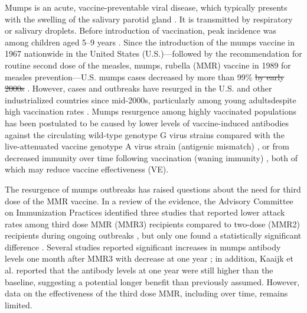 \documentclass[12pt]{article}
\providecommand{\DIFaddtex}[1]{{\protect\color{blue}\uwave{#1}}} %
\providecommand{\DIFdeltex}[1]{{\protect\color{red}\sout{#1}}}                      %
\providecommand{\DIFaddbegin}{} %
\providecommand{\DIFaddend}{} %
\providecommand{\DIFdelbegin}{} %
\providecommand{\DIFdelend}{} %
\providecommand{\DIFadd}[1]{\texorpdfstring{\DIFaddtex{#1}}{#1}} %
\providecommand{\DIFdel}[1]{\texorpdfstring{\DIFdeltex{#1}}{}} %
\newcommand{\DIFscaledelfig}{0.5}
\newlength{\DIFdelgraphicswidth} %
\newlength{\DIFdelgraphicsheight} %
\newcommand{\DIFaddincludegraphics}[2][]{{\color{blue}\fbox{\DIFOincludegraphics[#1]{#2}}}} %
\newcommand{\DIFdelincludegraphics}[2][]{%
\sbox{\DIFdelgraphicsbox}{\DIFOincludegraphics[#1]{#2}}%
\settoboxwidth{\DIFdelgraphicswidth}{\DIFdelgraphicsbox} %
\settoboxtotalheight{\DIFdelgraphicsheight}{\DIFdelgraphicsbox} %
\scalebox{\DIFscaledelfig}{%
\parbox[b]{\DIFdelgraphicswidth}{\usebox{\DIFdelgraphicsbox}\\[-\baselineskip] \rule{\DIFdelgraphicswidth}{0em}}\llap{\resizebox{\DIFdelgraphicswidth}{\DIFdelgraphicsheight}{%
\setlength{\unitlength}{\DIFdelgraphicswidth}%
\begin{picture}(1,1)%
\thicklines\linethickness{2pt} %
{\color[rgb]{1,0,0}\put(0,0){\framebox(1,1){}}}%
{\color[rgb]{1,0,0}\put(0,0){\line( 1,1){1}}}%
{\color[rgb]{1,0,0}\put(0,1){\line(1,-1){1}}}%
\end{picture}%
}\hspace*{3pt}}} %
} %
\DeclareRobustCommand{\DIFaddbegin}{\DIFOaddbegin \let\includegraphics\DIFaddincludegraphics} %
\DeclareRobustCommand{\DIFaddend}{\DIFOaddend \let\includegraphics\DIFOincludegraphics} %
\DeclareRobustCommand{\DIFdelbegin}{\DIFOdelbegin \let\includegraphics\DIFdelincludegraphics} %
\DeclareRobustCommand{\DIFdelend}{\DIFOaddend \let\includegraphics\DIFOincludegraphics} %
\begin{document}
Mumps is an acute, vaccine-preventable viral disease, which typically presents with the swelling of the salivary parotid gland \citep{hviid2008mumps}.
It is transmitted by respiratory or salivary droplets.
Before introduction of vaccination, peak incidence was among children aged 5–9 years \citep{galazka1999mumps}.
Since the introduction of the mumps vaccine in 1967 nationwide in the United States (U.S.)---followed by the recommendation for routine second dose of the measles, mumps, rubella (MMR) vaccine in 1989 for measles prevention---U.S. mumps cases decreased by more than 99\% \DIFdelbegin \DIFdel{by early 2000s }\DIFdelend \citep{mclean2013prevention}.
However, cases and outbreaks have resurged in the U.S. \citep{ogbuanu2012impact,nelson2013epidemiology,cardemil2017effectiveness,wohl2020combining,lo2021influenza} and other industrialized countries since \DIFaddbegin \DIFadd{the }\DIFaddend mid-2000s, particularly among young adults\DIFaddbegin \DIFadd{, }\DIFaddend despite high vaccination rates \citep{aasheim2014outbreak,vygen2016waning}.
Mumps resurgence among highly vaccinated populations has been postulated to be caused by lower levels of vaccine-induced antibodies against the circulating wild-type genotype G virus strains compared with the live-attenuated vaccine genotype A virus strain (antigenic mismatch) \citep{peltola2007mumps,rubin2008antibody}, \DIFaddbegin \DIFadd{and/}\DIFaddend or from decreased immunity over time following vaccination (waning immunity) \citep{lewnard2018vaccine,seagle2018measles,gokhale2023disentangling}, both of which may reduce vaccine effectiveness (VE).

The resurgence of mumps outbreaks has raised questions about the need for third dose of the MMR vaccine.
In a review of the evidence, the Advisory Committee on Immunization Practices \citep{marin2018recommendation} identified three studies that reported lower attack rates among third dose MMR (MMR3) recipients compared to two-dose (MMR2) recipients during ongoing outbreaks \citep{ogbuanu2012impact,nelson2013epidemiology,cardemil2017effectiveness}, but only one found a statistically significant difference \citep{cardemil2017effectiveness}. 
Several studies reported significant increases in mumps antibody levels one month after MMR3 with decrease at one year \citep{fiebelkorn2014mumps,latner2017mumps,kaaijk2020third};
in addition, Kaaijk et al. reported that the antibody levels at one year were still higher than the baseline, suggesting a potential longer benefit than previously assumed. 
However, data on the effectiveness of the third dose MMR, including over time, remains limited.
\end{document}
